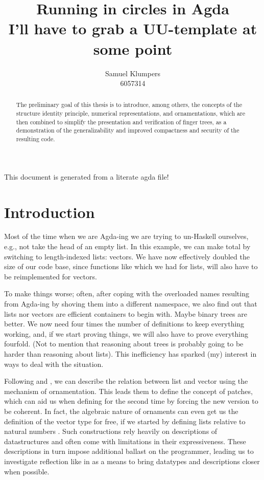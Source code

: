 \documentclass{article}
\title{Running in circles in Agda\\ \small I'll have to grab a UU-template at some point}
\author{Samuel Klumpers\\6057314}
\begin{document}
\maketitle
\tableofcontents

This document is generated from a literate agda file!
\newpage

\begin{abstract}
    The preliminary goal of this thesis is to introduce, among others, the concepts of the structure identity principle, numerical representations, and ornamentations, which are then combined to simplify the presentation and verification of finger trees, as a demonstration of the generalizability and improved compactness and security of the resulting code. 
\end{abstract}

\section{Introduction}\label{sec:intro}
Most of the time when we are Agda-ing \cite{agda} we are trying to un-Haskell ourselves, e.g., not take the head of an empty list. In this example, we can make  total by switching to length-indexed lists: vectors. We have now effectively doubled the size of our code base, since functions like \AgdaFunction{\_++\_} which we had for lists, will also have to be reimplemented for vectors.

To make things worse; often, after coping with the overloaded names resulting from Agda-ing by shoving them into a different namespace, we also find out that lists nor vectors are efficient containers to begin with. Maybe binary trees are better. We now need four times the number of definitions to keep everything working, and, if we start proving things, we will also have to prove everything fourfold. (Not to mention that reasoning about trees is probably going to be harder than reasoning about lists).  This inefficiency has sparked (my) interest in ways to deal with the situation.

Following \cite{orntrans} and \cite{progorn}, we can describe the relation between list and vector using the mechanism of ornamentation. This leads them to define the concept of patches, which can aid us when defining \AgdaFunction{\_++\_} for the second time by forcing the new version to be coherent. In fact, the algebraic nature of ornaments can even get us the definition of the vector type for free, if we started by defining lists relative to natural numbers \cite{algorn}. Such constructions rely heavily on descriptions of datastructures and often come with limitations in their expressiveness. These descriptions in turn impose additional ballast on the programmer, leading us to investigate reflection like in \cite{practgen} as a means to bring datatypes and descriptions closer when possible.
\end{document}
